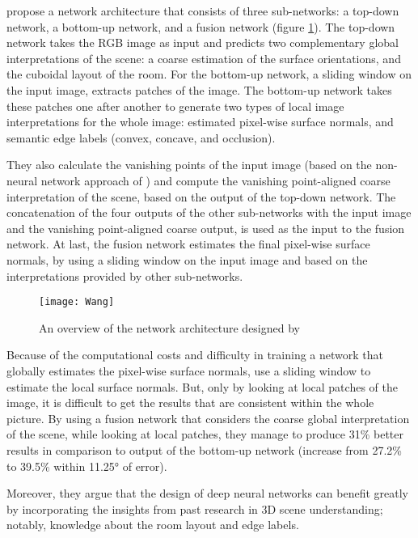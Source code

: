 \citeauthor*{wang} \cite{wang} propose a network architecture that consists of three sub-networks: a top-down network, a bottom-up network, and a fusion network  (figure \ref{fig:wang}). The top-down network takes the RGB image as input and predicts two complementary global interpretations of the scene: a coarse estimation of the surface orientations, and the cuboidal layout of the room. For the bottom-up network, a sliding window on the input image, extracts patches of the image. The bottom-up network takes these patches one after another to generate two types of local image interpretations for the whole image: estimated pixel-wise surface normals, and semantic edge labels (convex, concave, and occlusion). 

They also calculate the vanishing points of the input image (based on the non-neural network approach of \citeauthor*{vanishingpoints} \cite{vanishingpoints}) and compute the vanishing point-aligned coarse interpretation of the scene, based on the output of the top-down network. The concatenation of the four outputs of the other sub-networks with the input image and the vanishing point-aligned coarse output, is used as the input to the fusion network. At last, the fusion network estimates the final pixel-wise surface normals, by using a sliding window on the input image and based on the interpretations provided by other sub-networks.

\begin{figure}[h]
    \centering
    \texttt{[image: Wang]}
    \caption{An overview of the network architecture designed by \citeauthor*{wang} \cite{wang}}
    \label{fig:wang}
\end{figure}

Because of the computational costs and difficulty in training a network that globally estimates the pixel-wise surface normals, \citeauthor*{wang} use a sliding window to estimate the local surface normals. But, only by looking at local patches of the image, it is difficult to get the results that are consistent within the whole picture. By using a fusion network that considers the coarse global interpretation of the scene, while looking at local patches, they manage to produce 31\% better results in comparison to output of the bottom-up network (increase from 27.2\% to 39.5\% within \ang{11.25} of error).  

Moreover, they argue that the design of deep neural networks can benefit greatly by incorporating the insights from past research in 3D scene understanding; notably, knowledge about the room layout and edge labels. 

